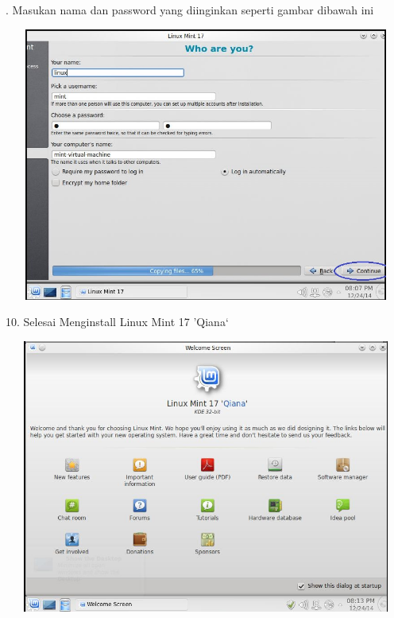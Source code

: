 \documentclass[11pt,fleqn]{book} %
\begin{document}
. Masukan nama dan password yang diinginkan seperti gambar dibawah ini
\begin{center}
\includegraphics[width=14cm,height=9cm]{Capture11.JPG}\\
\end{center}
10. Selesai Menginstall Linux Mint 17 'Qiana`
\begin{center}
\includegraphics[width=14cm,height=9cm]{Capture12.JPG}\\
\end{center}
\end{document}
